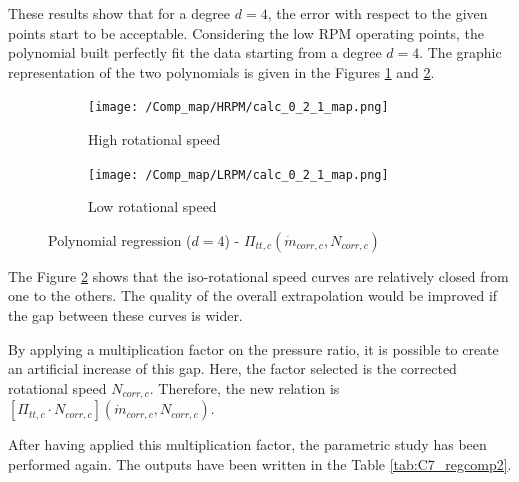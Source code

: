 These results show that for a degree $d=4$, the error with respect to the given points start to be acceptable.  Considering the low RPM operating points, the polynomial built perfectly fit the data starting from a degree $d=4$. The graphic representation of the two polynomials is given in the Figures \ref{fig:C7_polycomp_P_HRPM} and \ref{fig:C7_polycomp_P_LRPM}.

\begin{figure}[H]
    \centering
    \begin{subfigure}[b]{0.4\textwidth}
        \centering
        \texttt{[image: /Comp\_map/HRPM/calc\_0\_2\_1\_map.png]}
        \caption{High rotational speed}
        \label{fig:C7_polycomp_P_HRPM}
    \end{subfigure}
    \begin{subfigure}[b]{0.4\textwidth}
        \centering
        \texttt{[image: /Comp\_map/LRPM/calc\_0\_2\_1\_map.png]}
        \caption{Low rotational speed}
        \label{fig:C7_polycomp_P_LRPM}
    \end{subfigure}
    \caption{Polynomial regression ($d=4$) - $\Pi_{tt,c}(\dot{m}_{corr,c},N_{corr,c})$} \label{fig:C7_polycomp_P}
\end{figure}

The Figure \ref{fig:C7_polycomp_P_LRPM} shows that the iso-rotational speed curves are relatively closed from one to the others. The quality of the overall extrapolation would be improved if the gap between these curves is wider. 

By applying a multiplication factor on the pressure ratio, it is possible to create an artificial increase of this gap. Here, the factor selected is the corrected rotational speed $N_{corr,c}$. Therefore, the new relation is $[\Pi_{tt,c}\cdot N_{corr,c}](\dot{m}_{corr,c},N_{corr,c})$. 

After having applied this multiplication factor, the parametric study has been performed again. The outputs have been written in the Table \ref{tab:C7_regcomp2}.


